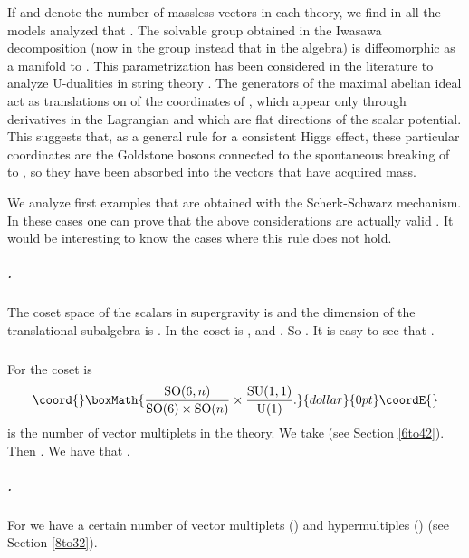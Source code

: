 \documentclass[a4paper,12pt]{article}
\begin{document}
If \coordHE{} and \coordHE{} denote the number of massless  vectors in each
theory, we find  in  all the models analyzed that \coordHE{}.
The solvable group obtained in the Iwasawa decomposition (now in
the group instead that in the algebra) is diffeomorphic as a
manifold to \coordHE{}.  This parametrization has been considered in
the literature to analyze U-dualities in string theory
\cite{adfft,lps,cjlp}. The generators of the maximal abelian ideal
act as  translations on \coordHE{} of the coordinates of \coordHE{}, which
appear only through derivatives in the Lagrangian and
 which are flat directions of  the scalar potential. This suggests that, as a general
rule for a consistent Higgs effect, these particular coordinates
are the Goldstone bosons connected to the spontaneous breaking of
\coordHE{} to \coordHE{}, so they have been absorbed into the
vectors that have acquired mass.

We analyze first  examples that are obtained with the
Scherk-Schwarz mechanism. In  these cases one can prove that the
above considerations are actually valid \cite{ss,css,svn}. It
would be interesting to know the cases where this rule does not
hold.

\subparagraph{\coordHE{}.} The coset space of the
scalars in  \coordHE{} supergravity is \coordHE{} and the
dimension of the translational subalgebra is \coordHE{} \cite{adfft}.
In \coordHE{} the coset is \coordHE{}, and \coordHE{}. So
\coordHE{}. It is easy to see that \coordHE{}.

\subparagraph {\coordHE{}} For \coordHE{} the coset is
$$\coord{}\boxMath{\frac{\rSO(6,n)}{\rSO(6)\times\rSO(n)}\times
\frac{\rSU(1,1)}{\rU(1)}. }{dollar}{0pt}\coordE{}$$\coordHE{} is the number of vector multiplets
in the theory. We take \coordHE{} (see Section \ref{6to42}). Then
\coordHE{}. We have  that  \coordHE{}.

\subparagraph{\coordHE{}.} For \coordHE{} we  have a
certain number of vector multiplets  (\coordHE{}) and hypermultiples
(\coordHE{}) (see Section \ref{8to32}).
\end{document}
